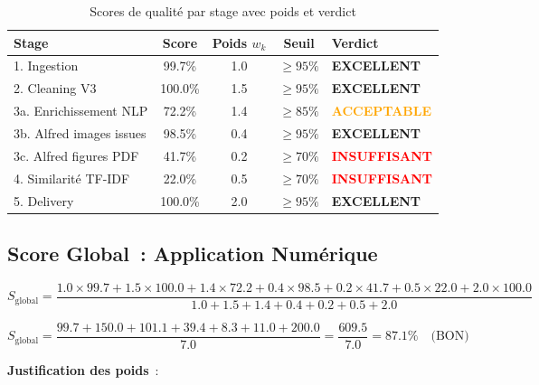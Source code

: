 \begin{table}[H]
\centering
\begin{tabular}{lcccl}
\toprule
\textbf{Stage} & \textbf{Score} & \textbf{Poids $w_k$} & \textbf{Seuil} & \textbf{Verdict} \\
\midrule
1. Ingestion & 99.7\% & 1.0 & $\geq 95\%$ & \textcolor{green!60!black}{\textbf{EXCELLENT}} \\
2. Cleaning V3 & 100.0\% & 1.5 & $\geq 95\%$ & \textcolor{green!60!black}{\textbf{EXCELLENT}} \\
3a. Enrichissement NLP & 72.2\% & 1.4 & $\geq 85\%$ & \textcolor{orange}{\textbf{ACCEPTABLE}} \\
3b. Alfred images issues & 98.5\% & 0.4 & $\geq 95\%$ & \textcolor{green!60!black}{\textbf{EXCELLENT}} \\
3c. Alfred figures PDF & 41.7\% & 0.2 & $\geq 70\%$ & \textcolor{red}{\textbf{INSUFFISANT}} \\
4. Similarité TF-IDF & 22.0\% & 0.5 & $\geq 70\%$ & \textcolor{red}{\textbf{INSUFFISANT}} \\
5. Delivery & 100.0\% & 2.0 & $\geq 95\%$ & \textcolor{green!60!black}{\textbf{EXCELLENT}} \\
\bottomrule
\end{tabular}
\caption{Scores de qualité par stage avec poids et verdict}
\label{tab:eval_scores_synthese}
\end{table}

\subsection{Score Global~: Application Numérique}
\label{sec:score_global_calcul}

\begin{equation}
S_{\text{global}} = \frac{1.0 \times 99.7 + 1.5 \times 100.0 + 1.4 \times 72.2 + 0.4 \times 98.5 + 0.2 \times 41.7 + 0.5 \times 22.0 + 2.0 \times 100.0}{1.0 + 1.5 + 1.4 + 0.4 + 0.2 + 0.5 + 2.0}
\end{equation}

\begin{equation}
S_{\text{global}} = \frac{99.7 + 150.0 + 101.1 + 39.4 + 8.3 + 11.0 + 200.0}{7.0} = \frac{609.5}{7.0} = \boxed{87.1\%} \quad \text{(BON)}
\label{eq:score_global_numerique}
\end{equation}

\textbf{Justification des poids}~:

